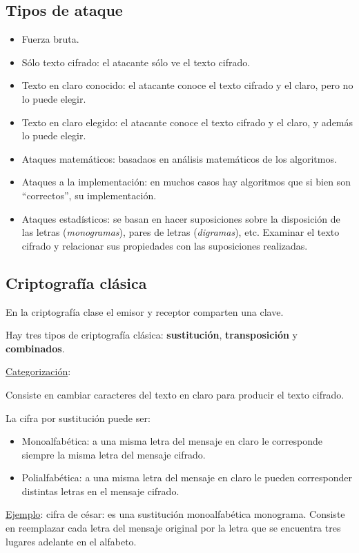 \subsection{Tipos de ataque}
\begin{itemize}
	\item Fuerza bruta.
	\item Sólo texto cifrado: el atacante sólo ve el texto cifrado.
	\item Texto en claro conocido: el atacante conoce el texto cifrado y el claro, pero no lo puede elegir.
	\item Texto en claro elegido: el atacante conoce el texto cifrado y el claro, y además lo puede elegir.
	\item Ataques matemáticos: basadaos en análisis matemáticos de los algoritmos.
	\item Ataques a la implementación: en muchos casos hay algoritmos que si bien son ``correctos'', su implementación.
	\item Ataques estadísticos: se basan en hacer suposiciones sobre la disposición de las letras (\emph{monogramas}), pares de letras (\emph{digramas}), etc. Examinar el texto cifrado y relacionar sus propiedades con las suposiciones realizadas. 
\end{itemize}

\subsection{Criptografía clásica}
En la criptografía clase el emisor y receptor comparten una clave.

Hay tres tipos de criptografía clásica: \textbf{sustitución}, \textbf{transposición} y \textbf{combinados}.

\underline{Categorización}:

Consiste en cambiar caracteres del texto en claro para producir el texto cifrado.

La cifra por sustitución puede ser:
\begin{itemize}
	\item Monoalfabética: a una misma letra del mensaje en claro le corresponde siempre la misma letra del mensaje cifrado.
	\item Polialfabética: a una misma letra del mensaje en claro le pueden corresponder distintas letras en el mensaje cifrado.
\end{itemize}

\underline{Ejemplo}: cifra de césar: es una sustitución monoalfabética monograma. Consiste en reemplazar cada letra del mensaje original por la letra que se encuentra tres lugares adelante en el alfabeto.

